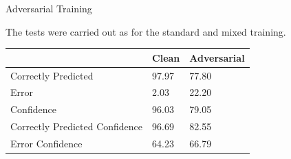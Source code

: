 \begin{tframe}{Adversarial Training}

The tests were carried out as for the standard and mixed training.

\begin{table}[h]
\centering
\begin{tabular}{@{}lll@{}}
\toprule
                               & Clean & Adversarial \\ \midrule
Correctly Predicted            & 97.97 & 77.80       \\
Error                          & 2.03  & 22.20       \\
Confidence                     & 96.03 & 79.05       \\
Correctly Predicted Confidence & 96.69 & 82.55       \\
Error Confidence               & 64.23 & 66.79       \\ \bottomrule
\end{tabular}
\end{table}

\end{tframe}